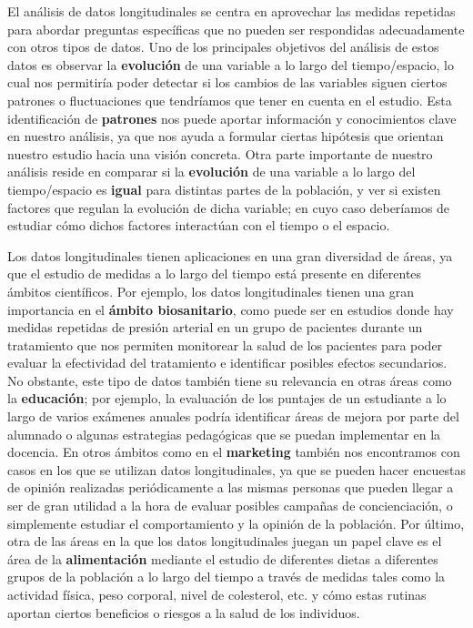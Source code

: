 \documentclass[
  letterpaper,
  DIV=11,
  numbers=noendperiod]{scrreprt}
\begin{document}
El análisis de datos longitudinales se centra en aprovechar las medidas
repetidas para abordar preguntas específicas que no pueden ser
respondidas adecuadamente con otros tipos de datos. Uno de los
principales objetivos del análisis de estos datos es observar la
\textbf{evolución} de una variable a lo largo del tiempo/espacio, lo
cual nos permitiría poder detectar si los cambios de las variables
siguen ciertos patrones o fluctuaciones que tendríamos que tener en
cuenta en el estudio. Esta identificación de \textbf{patrones} nos puede
aportar información y conocimientos clave en nuestro análisis, ya que
nos ayuda a formular ciertas hipótesis que orientan nuestro estudio
hacia una visión concreta. Otra parte importante de nuestro análisis
reside en comparar si la \textbf{evolución} de una variable a lo largo
del tiempo/espacio es \textbf{igual} para distintas partes de la
población, y ver si existen factores que regulan la evolución de dicha
variable; en cuyo caso deberíamos de estudiar cómo dichos factores
interactúan con el tiempo o el espacio.

Los datos longitudinales tienen aplicaciones en una gran diversidad de
áreas, ya que el estudio de medidas a lo largo del tiempo está presente
en diferentes ámbitos científicos. Por ejemplo, los datos longitudinales
tienen una gran importancia en el \textbf{ámbito biosanitario}, como
puede ser en estudios donde hay medidas repetidas de presión arterial en
un grupo de pacientes durante un tratamiento que nos permiten monitorear
la salud de los pacientes para poder evaluar la efectividad del
tratamiento e identificar posibles efectos secundarios. No obstante,
este tipo de datos también tiene su relevancia en otras áreas como la
\textbf{educación}; por ejemplo, la evaluación de los puntajes de un
estudiante a lo largo de varios exámenes anuales podría identificar
áreas de mejora por parte del alumnado o algunas estrategias pedagógicas
que se puedan implementar en la docencia. En otros ámbitos como en el
\textbf{marketing} también nos encontramos con casos en los que se
utilizan datos longitudinales, ya que se pueden hacer encuestas de
opinión realizadas periódicamente a las mismas personas que pueden
llegar a ser de gran utilidad a la hora de evaluar posibles campañas de
concienciación, o simplemente estudiar el comportamiento y la opinión de
la población. Por último, otra de las áreas en la que los datos
longitudinales juegan un papel clave es el área de la
\textbf{alimentación} mediante el estudio de diferentes dietas a
diferentes grupos de la población a lo largo del tiempo a través de
medidas tales como la actividad física, peso corporal, nivel de
colesterol, etc. y cómo estas rutinas aportan ciertos beneficios o
riesgos a la salud de los individuos.
\end{document}
